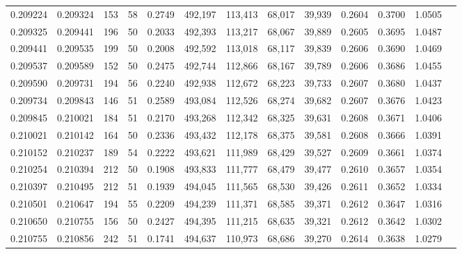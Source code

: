 \begin{tabular}{rrrrrrrrrrrrr}
0.209224 & 0.209324 &   153 &  58 &                                     0.2749 & 492,197 & 113,413 &  68,017 &  39,939 & 0.2604 & 0.3700 & 1.0505 \\
0.209325 & 0.209441 &   196 &  50 &                                     0.2033 & 492,393 & 113,217 &  68,067 &  39,889 & 0.2605 & 0.3695 & 1.0487 \\
0.209441 & 0.209535 &   199 &  50 &                                     0.2008 & 492,592 & 113,018 &  68,117 &  39,839 & 0.2606 & 0.3690 & 1.0469 \\
0.209537 & 0.209589 &   152 &  50 &                                     0.2475 & 492,744 & 112,866 &  68,167 &  39,789 & 0.2606 & 0.3686 & 1.0455 \\
0.209590 & 0.209731 &   194 &  56 &                                     0.2240 & 492,938 & 112,672 &  68,223 &  39,733 & 0.2607 & 0.3680 & 1.0437 \\
0.209734 & 0.209843 &   146 &  51 &                                     0.2589 & 493,084 & 112,526 &  68,274 &  39,682 & 0.2607 & 0.3676 & 1.0423 \\
0.209845 & 0.210021 &   184 &  51 &                                     0.2170 & 493,268 & 112,342 &  68,325 &  39,631 & 0.2608 & 0.3671 & 1.0406 \\
0.210021 & 0.210142 &   164 &  50 &                                     0.2336 & 493,432 & 112,178 &  68,375 &  39,581 & 0.2608 & 0.3666 & 1.0391 \\
0.210152 & 0.210237 &   189 &  54 &                                     0.2222 & 493,621 & 111,989 &  68,429 &  39,527 & 0.2609 & 0.3661 & 1.0374 \\
0.210254 & 0.210394 &   212 &  50 &                                     0.1908 & 493,833 & 111,777 &  68,479 &  39,477 & 0.2610 & 0.3657 & 1.0354 \\
0.210397 & 0.210495 &   212 &  51 &                                     0.1939 & 494,045 & 111,565 &  68,530 &  39,426 & 0.2611 & 0.3652 & 1.0334 \\
0.210501 & 0.210647 &   194 &  55 &                                     0.2209 & 494,239 & 111,371 &  68,585 &  39,371 & 0.2612 & 0.3647 & 1.0316 \\
0.210650 & 0.210755 &   156 &  50 &                                     0.2427 & 494,395 & 111,215 &  68,635 &  39,321 & 0.2612 & 0.3642 & 1.0302 \\
0.210755 & 0.210856 &   242 &  51 &                                     0.1741 & 494,637 & 110,973 &  68,686 &  39,270 & 0.2614 & 0.3638 & 1.0279 \\

\end{tabular}
